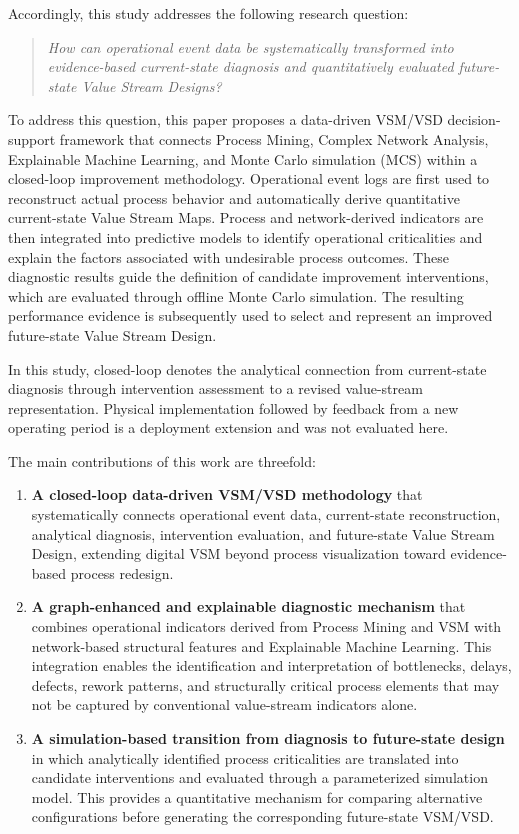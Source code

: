 \documentclass[pdflatex,iicol,Numbered,sn-basic]{sn-jnl}
\begin{document}
Accordingly, this study addresses the following research question:

\begin{quote}
\textit{How can operational event data be systematically transformed into
evidence-based current-state diagnosis and quantitatively evaluated
future-state Value Stream Designs?}
\end{quote}

To address this question, this paper proposes a data-driven VSM/VSD
decision-support framework that connects Process Mining, Complex Network
Analysis, Explainable Machine Learning, and Monte Carlo simulation (MCS) within a
closed-loop improvement methodology. Operational event logs are first used to
reconstruct actual process behavior and automatically derive quantitative
current-state Value Stream Maps. Process and network-derived indicators are
then integrated into predictive models to identify operational criticalities
and explain the factors associated with undesirable process outcomes. These
diagnostic results guide the definition of candidate improvement interventions,
which are evaluated through offline Monte Carlo simulation. The resulting performance
evidence is subsequently used to select and represent an improved future-state
Value Stream Design.

In this study, closed-loop denotes the analytical connection from current-state diagnosis through intervention assessment to a revised value-stream representation. Physical implementation followed by feedback from a new operating period is a deployment extension and was not evaluated here.

The main contributions of this work are threefold:

\begin{enumerate}

\item \textbf{A closed-loop data-driven VSM/VSD methodology} that systematically
connects operational event data, current-state reconstruction, analytical
diagnosis, intervention evaluation, and future-state Value Stream Design,
extending digital VSM beyond process visualization toward evidence-based
process redesign.

\item \textbf{A graph-enhanced and explainable diagnostic mechanism} that
combines operational indicators derived from Process Mining and VSM with
network-based structural features and Explainable Machine Learning. This
integration enables the identification and interpretation of bottlenecks,
delays, defects, rework patterns, and structurally critical process elements
that may not be captured by conventional value-stream indicators alone.

\item \textbf{A simulation-based transition from diagnosis to future-state
design} in which analytically identified process criticalities are translated
into candidate interventions and evaluated through a parameterized simulation model.
This provides a quantitative mechanism for comparing alternative configurations
before generating the corresponding future-state VSM/VSD.

\end{enumerate}
\end{document}
